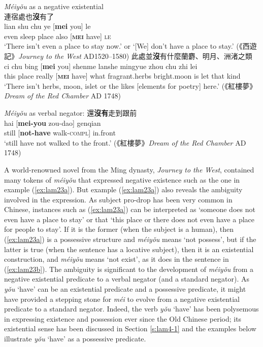\documentclass[output=paper]{langscibook}
\begin{document}
\ea \textit{Méiyǒu} as a negative existential \label{ex:lam23}\\
  \ea 連宿處也\textbf{沒}有了 \label{ex:lam23a}\\
  	\gll lian shu chu ye [\textbf{mei} you] le\\ 
  	even sleep place also [\textbf{\textsc{mei}} have] \textsc{le}\\
  	\glt `There isn't even a place to stay now.' or `[We] don't have a place to stay.' (《西遊記》\emph{Journey to the West} AD1520–1580)
  \ex 此處並\textbf{沒}有什麼蘭麝、明月、洲渚之類 \label{ex:lam23b}\\
  	\gll ci chu bing [\textbf{mei} you] shenme lanshe mingyue zhou chu zhi lei\\
  	this	 place really [\textbf{\textsc{mei}} have] what fragrant.herbs bright.moon is let that kind\\ 
  	\glt `There isn't herbs, moon, islet or the likes [elements for poetry] here.' (《紅樓夢》\emph{Dream of the Red Chamber} AD 1748)
\z \z


\ea \textit{Méiyǒu} as verbal negator: 還\textbf{沒有}走到跟前 \label{ex:lam24}\\
  \gll hai [\textbf{mei-you} zou-dao] genqian\\
  still [\textbf{not-have} walk-\textsc{compl}] in.front\\
  \glt `still have not walked to the front.' (《紅樓夢》\emph{Dream of the Red Chamber} AD 1748)
\z


A world-renowned novel from the Ming dynasty, \emph{Journey to the West}, contained many tokens of \textit{méiyǒu} that expressed negative existence such as the one in example (\ref{ex:lam23a}). But example (\ref{ex:lam23a}) also reveals the ambiguity involved in the expression. As subject pro-drop has been very common in Chinese, instances such as (\ref{ex:lam23a}) can be interpreted as `someone does not even have a place to stay' or that `this place or there does not even have a place for people to stay'. If it is the former (when the subject is a human), then (\ref{ex:lam23a}) is a possessive structure and \textit{méiyǒu} means `not possess', but if the latter is true (when the sentence has a locative subject), then it is an existential construction, and \textit{méiyǒu} means `not exist', as it does in the sentence in (\ref{ex:lam23b}). The ambiguity is significant to the development of \textit{méiyǒu} from a negative existential predicate to a verbal negator (and a standard negator). As \textit{yǒu} `have' can be an existential predicate and a possessive predicate, it might have provided a stepping stone for \textit{méi} to evolve from a negative existential predicate to a standard negator. Indeed, the verb \textit{yǒu} `have' has been polysemous in expressing existence and possession ever since the Old Chinese period; its existential sense has been discussed in Section \ref{s:lam4-1} and the examples below illustrate \textit{yǒu} `have' as a possessive predicate. 
\end{document}
